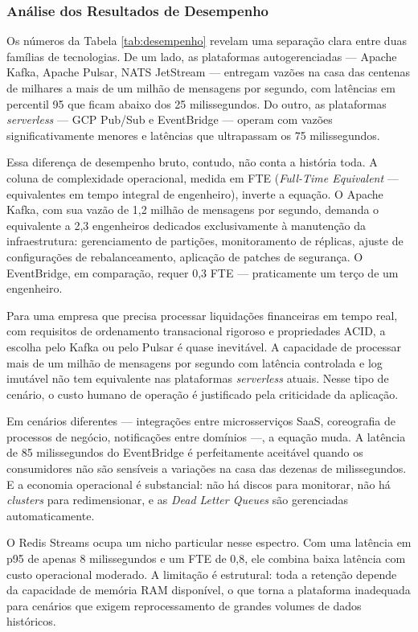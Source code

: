 \documentclass[12pt, a4paper]{article}
\begin{document}
\subsubsection{Análise dos Resultados de Desempenho}

Os números da Tabela \ref{tab:desempenho} revelam uma separação clara entre duas famílias de tecnologias. De um lado, as plataformas autogerenciadas --- Apache Kafka, Apache Pulsar, NATS JetStream --- entregam vazões na casa das centenas de milhares a mais de um milhão de mensagens por segundo, com latências em percentil 95 que ficam abaixo dos 25 milissegundos. Do outro, as plataformas \textit{serverless} --- GCP Pub/Sub e EventBridge --- operam com vazões significativamente menores e latências que ultrapassam os 75 milissegundos.

Essa diferença de desempenho bruto, contudo, não conta a história toda. A coluna de complexidade operacional, medida em FTE (\textit{Full-Time Equivalent} --- equivalentes em tempo integral de engenheiro), inverte a equação. O Apache Kafka, com sua vazão de 1,2 milhão de mensagens por segundo, demanda o equivalente a 2,3 engenheiros dedicados exclusivamente à manutenção da infraestrutura: gerenciamento de partições, monitoramento de réplicas, ajuste de configurações de rebalanceamento, aplicação de patches de segurança. O EventBridge, em comparação, requer 0,3 FTE --- praticamente um terço de um engenheiro.

Para uma empresa que precisa processar liquidações financeiras em tempo real, com requisitos de ordenamento transacional rigoroso e propriedades ACID, a escolha pelo Kafka ou pelo Pulsar é quase inevitável. A capacidade de processar mais de um milhão de mensagens por segundo com latência controlada e log imutável não tem equivalente nas plataformas \textit{serverless} atuais. Nesse tipo de cenário, o custo humano de operação é justificado pela criticidade da aplicação.

Em cenários diferentes --- integrações entre microsserviços SaaS, coreografia de processos de negócio, notificações entre domínios ---, a equação muda. A latência de 85 milissegundos do EventBridge é perfeitamente aceitável quando os consumidores não são sensíveis a variações na casa das dezenas de milissegundos. E a economia operacional é substancial: não há discos para monitorar, não há \textit{clusters} para redimensionar, e as \textit{Dead Letter Queues} são gerenciadas automaticamente.

O Redis Streams ocupa um nicho particular nesse espectro. Com uma latência em p95 de apenas 8 milissegundos e um FTE de 0,8, ele combina baixa latência com custo operacional moderado. A limitação é estrutural: toda a retenção depende da capacidade de memória RAM disponível, o que torna a plataforma inadequada para cenários que exigem reprocessamento de grandes volumes de dados históricos.
\end{document}
